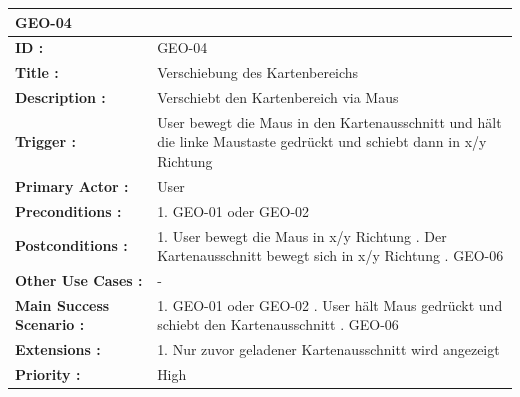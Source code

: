 	\begin{table}[H]
		\begin{tabular}{|p{8cm}|p{8cm}|}
			\hline
			\textbf{GEO-04 } \\ 
			\hline
			\textbf{ID :}\centering & GEO-04  \\ \hline 
			\textbf{Title :}\centering & Verschiebung des Kartenbereichs \\ \hline 
			\textbf{Description :}\centering & Verschiebt den Kartenbereich via Maus \\ \hline 
			\textbf{Trigger :}\centering & User bewegt die Maus in den Kartenausschnitt und hält die linke Maustaste gedrückt und schiebt dann in x/y Richtung  \\ \hline 
			\textbf{Primary Actor :} \centering & User \\ \hline 
			\textbf{Preconditions :}\centering & 
			1. GEO-01 oder GEO-02 \\ \hline 
			\textbf{Postconditions :}\centering & 
			1. User bewegt die Maus in x/y Richtung \newline
			2. Der Kartenausschnitt bewegt sich in x/y Richtung \newline
			3. GEO-06 \\ \hline
			\textbf{Other Use Cases :}\centering & - \\ \hline  
			\textbf{Main Success Scenario :}\centering & 
			1. GEO-01 oder GEO-02 \newline
			2. User hält Maus gedrückt und schiebt den Kartenausschnitt \newline
			3. GEO-06 \\ \hline  
			\textbf{Extensions :}\centering & 
			1. Nur zuvor geladener Kartenausschnitt wird angezeigt \\ \hline  
			\textbf{Priority :}\centering & High \\ \hline  
		\end{tabular}
	\end{table}
	
